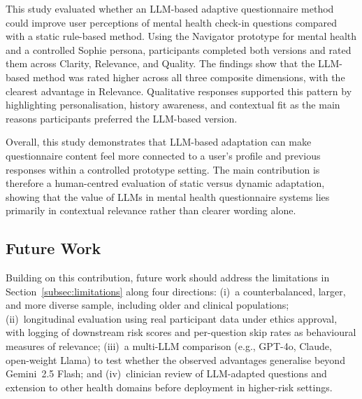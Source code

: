 \documentclass[conference]{IEEEtran}
\begin{document}
This study evaluated whether an LLM-based adaptive questionnaire method could
improve user perceptions of mental health check-in questions compared with a
static rule-based method. Using the Navigator prototype for mental health and a controlled Sophie
persona, participants completed both versions and rated them across Clarity,
Relevance, and Quality. The findings show that the LLM-based method was rated
higher across all three composite dimensions, with the clearest advantage in
Relevance. Qualitative responses supported this pattern by highlighting
personalisation, history awareness, and contextual fit as the main reasons
participants preferred the LLM-based version.

Overall, this study demonstrates that LLM-based adaptation can make
questionnaire content feel more connected to a user's profile and previous
responses within a controlled prototype setting. The main contribution is
therefore a human-centred evaluation of static versus dynamic adaptation,
showing that the value of LLMs in mental health questionnaire systems lies
primarily in contextual relevance rather than clearer wording alone.


\subsection{Future Work}
\label{subsec:future}

Building on this contribution, future work should address the
limitations in Section~\ref{subsec:limitations} along four directions:
(i)~a counterbalanced, larger, and more diverse sample, including
older and clinical populations; (ii)~longitudinal evaluation using real
participant data under ethics approval, with logging of downstream risk
scores and per-question skip rates as behavioural measures of
relevance; (iii)~a multi-LLM comparison (e.g., GPT-4o, Claude,
open-weight Llama) to test whether the observed advantages generalise
beyond Gemini~2.5 Flash; and (iv)~clinician review of LLM-adapted
questions and extension to other health domains before deployment in
higher-risk settings.


\end{document}
